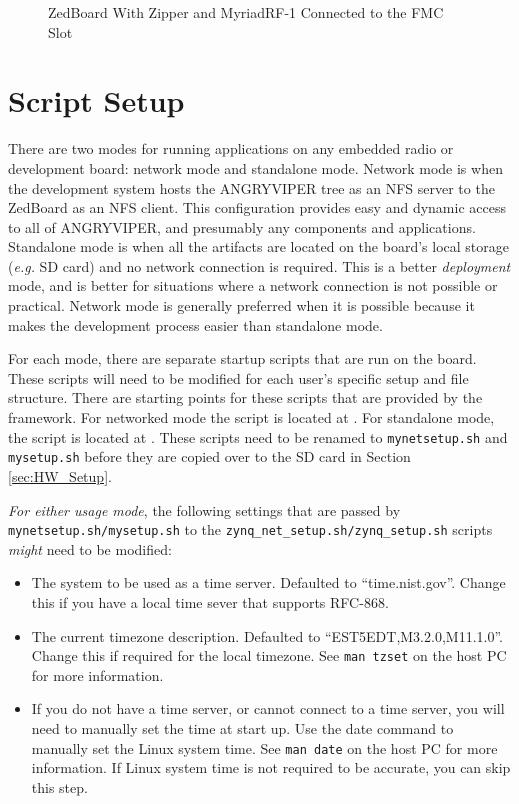\begin{flushleft}
\begin{figure}[ht]
	\caption{ZedBoard With Zipper and MyriadRF-1 Connected to the FMC Slot}
	\label{fig:zed_zipper}
\end{figure}
\end{flushleft}

\section{Script Setup}
There are two modes for running applications on any embedded radio or development board: network mode and standalone mode.  Network mode is when the development system hosts the ANGRYVIPER tree as an NFS server to the ZedBoard as an NFS client.  This configuration provides easy and dynamic access to all of ANGRYVIPER, and presumably any components and applications.  Standalone mode is when all the artifacts are located on the board's local storage (\textit{e.g.} SD card) and no network connection is required.  This is a better \textit{deployment} mode, and is better for situations where a network connection is not possible or practical.  Network mode is generally preferred when it is possible because it makes the development process easier than standalone mode.

\begin{flushleft}
For each mode, there are separate startup scripts that are run on the board. These scripts will need to be modified for each user's specific setup and file structure.  There are starting points for these scripts that are provided by the framework.  For networked mode the script is located at .  For standalone mode, the script is located at .  These scripts need to be renamed to \texttt{mynetsetup.sh} and \texttt{mysetup.sh} before they are copied over to the SD card in Section \ref{sec:HW_Setup}. \\ \bigskip

\textit{For either usage mode}, the following settings that are passed by \texttt{mynetsetup.sh/mysetup.sh} to the \texttt{zynq\_net\_setup.sh/zynq\_setup.sh} scripts \textit{might} need to be modified:
\end{flushleft}

\begin{itemize}
 \item The system to be used as a time server. Defaulted to ``time.nist.gov''. Change this if you have a local time sever that supports RFC-868.
 \item The current timezone description. Defaulted to ``EST5EDT,M3.2.0,M11.1.0''.  Change this if required for the local timezone. See \texttt{man tzset} on the host PC for more information.
 \item If you do not have a time server, or cannot connect to a time server, you will need to manually set the time at start up.  Use the date command to manually set the Linux system time. See \texttt{man date} on the host PC for more information.  If Linux system time is not required to be accurate, you can skip this step.
 \end{itemize}

